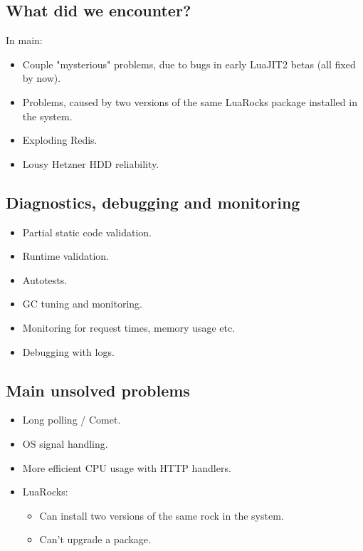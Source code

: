 \documentclass[aspectratio=169,handout,bigger]{beamer}
\begin{document}
\subsection*{What did we encounter?}

\begin{frame}
  In main:

  \begin{itemize}
    \item Couple "mysterious" problems, due to bugs in early LuaJIT2 betas (all fixed by now).
    \item Problems, caused by two versions of the same LuaRocks package installed in the system.
    \item Exploding Redis.
    \item Lousy Hetzner HDD reliability.
  \end{itemize}
\end{frame}


\subsection*{Diagnostics, debugging and monitoring}

\begin{frame}
  \begin{itemize}
    \item Partial static code validation.
    \item Runtime validation.
    \item Autotests.
    \item GC tuning and monitoring.
    \item Monitoring for request times, memory usage etc.
    \item Debugging with logs.
  \end{itemize}
\end{frame}


\subsection*{Main unsolved problems}

\begin{frame}
  \begin{itemize}
    \item Long polling / Comet.
    \item OS signal handling.
    \item More efficient CPU usage with HTTP handlers.
    \item LuaRocks:
    \begin{itemize}
      \item Can install two versions of the same rock in the system.
      \item Can't upgrade a package.
    \end{itemize}
  \end{itemize}
\end{frame}
\end{document}
